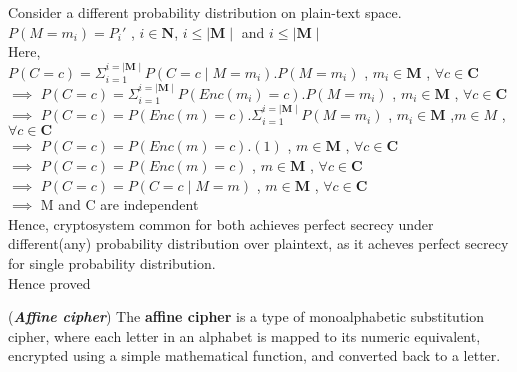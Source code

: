 \documentclass[11pt]{exam}
\begin{document}
\begin{questions}
\begin{solution}
    Consider a different probability distribution on plain-text space.\\
    $P(M=m_i) = P_i'$  , $i \in \textbf{N}$, $i \leq \mid\textbf{M}\mid$ and $i \leq \mid \textbf{M} \mid$\\
    Here,\\
    $P(C=c) = \Sigma_{i=1}^{i=\mid \textbf{M}\mid} P(C=c\mid M=m_i).P(M=m_i)$ , $m_i \in \textbf{M}$ , $\forall c \in \textbf{C}$ \\
    $\implies$ $P(C=c) = \Sigma_{i=1}^{i=\mid \textbf{M}\mid} P(Enc(m_i)=c).P(M=m_i)$ , $m_i \in \textbf{M}$ , $\forall c \in \textbf{C}$ \\
    $\implies$ $P(C=c) =  P(Enc(m)=c).\Sigma_{i=1}^{i=\mid \textbf{M}\mid}P(M=m_i)$ , $m_i \in \textbf{M}$ ,$m \in M$ , $\forall c \in \textbf{C}$ \\
    $\implies$  $P(C=c) =  P(Enc(m)=c).(1)$ , $m \in \textbf{M}$  , $\forall c \in \textbf{C}$ \\
    $\implies$ $P(C=c) =  P(Enc(m)=c)$ , $m \in \textbf{M}$  , $\forall c \in \textbf{C}$ \\
    $\implies$ $P(C=c) =  P(C=c\mid M=m)$ , $m \in \textbf{M}$  , $\forall c \in \textbf{C}$ \\
    $\implies$ M and C are independent\\
    
    Hence, cryptosystem common for both achieves perfect secrecy under different(any) probability distribution over plaintext, as it acheves perfect secrecy for single probability distribution.\\
    Hence proved\\
    
\end{solution}



\question[10] ({\bf \textit{Affine cipher}}) 
The \textbf{affine cipher} is a type of monoalphabetic substitution cipher, where each letter in an alphabet is mapped to its numeric equivalent, encrypted using a simple mathematical function, and converted back to a letter.
\end{questions}
\end{document}
